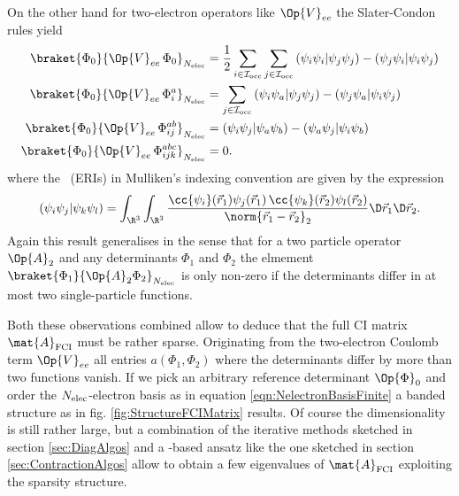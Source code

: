 \begin{rem}
	\noindent
	On the other hand for
	two-electron operators like $\Op{V}_{ee}$
	the Slater-Condon rules yield
	\begin{equation}
	\begin{aligned}
		\braket{\Phi_0}{\Op{V}_{ee}\, \Phi_0}_{\Nelec}
		&= \frac12 \sum_{i\in\Iocc} \sum_{j\in\Iocc}
			  \eriMu{\psi_i\psi_i}{\psi_j\psi_j}
			- \eriMu{\psi_j\psi_i}{\psi_i\psi_j} \\
		\braket{\Phi_0}{\Op{V}_{ee}\, \Phi_i^a}_{\Nelec}
		&= \sum_{j\in\Iocc}
			  \eriMu{\psi_i\psi_a}{\psi_j\psi_j}
			- \eriMu{\psi_j\psi_a}{\psi_i\psi_j} \\
		\braket{\Phi_0}{\Op{V}_{ee}\, \Phi_{ij}^{ab}}_{\Nelec}
		&= \eriMu{\psi_i\psi_j}{\psi_a\psi_b}
		 - \eriMu{\psi_a\psi_j}{\psi_i\psi_b} \\
		\braket{\Phi_0}{\Op{V}_{ee}\, \Phi_{ijk}^{abc}}_{\Nelec} &= 0.
	\end{aligned}
		\label{eqn:SlaterCondonCoulomb}
	\end{equation}
	where the ~(ERIs)
	in Mulliken's indexing convention are given by the expression
	\begin{equation}
		\eriMu{\psi_i \psi_j}{\psi_k \psi_l}
			= \int_{\R^3} \int_{\R^3}
				\frac{\cc{\psi_i}(\vec{r}_1) \psi_j(\vec{r}_1)
					\,\cc{\psi_k}(\vec{r}_2) \psi_l(\vec{r}_2)}
				{\norm{\vec{r}_1 - \vec{r}_2}_2}
				\D \vec{r}_1 \D \vec{r}_2.
		\label{eqn:ERI}
	\end{equation}
	Again this result generalises in the sense
	that for a two particle operator $\Op{A}_2$
	and any determinants $\Phi_1$ and $\Phi_2$
	the elmement $\braket{\Phi_1}{\Op{A}_2 \Phi_2}_{\Nelec}$
	is only non-zero if the determinants
	differ in at most two single-particle functions.

	Both these observations combined allow to deduce
	that the full CI matrix $\mat{A}_\text{FCI}$ must be rather sparse.
	Originating from the two-electron Coulomb term $\Op{V}_{ee}$
	all entries $a(\Phi_1, \Phi_2)$ where the determinants
	differ by more than two functions vanish.
	If we pick an arbitrary reference determinant $\Op{\Phi}_0$
	and order the $N_\text{elec}$-electron basis as in equation \eqref{eqn:NelectronBasisFinite}
	a banded structure as in fig. \vref{fig:StructureFCIMatrix} results.
	Of course the dimensionality is still rather large,
	but a combination of the iterative methods sketched
	in section \vref{sec:DiagAlgos}
	and a \contraction-based ansatz like the one sketched in section \vref{sec:ContractionAlgos}
	allow to obtain a few eigenvalues of $\mat{A}_\text{FCI}$
	exploiting the sparsity structure.
\end{rem}

